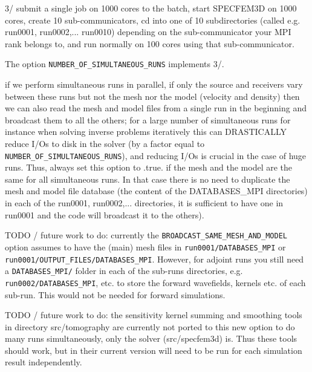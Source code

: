 \begin{description}
3/ submit a single job on 1000 cores to the batch, start SPECFEM3D on 1000 cores, create 10 sub-communicators,
cd into one of 10 subdirectories (called e.g. run0001, run0002,... run0010) depending on the sub-communicator
your MPI rank belongs to, and run normally on 100 cores using that sub-communicator.\newline

The option \texttt{NUMBER\_OF\_SIMULTANEOUS\_RUNS} implements 3/.\newline

\item [{\texttt{BROADCAST\_SAME\_MESH\_AND\_MODEL}}] if we perform simultaneous runs in parallel,
if only the source and receivers vary between these runs
but not the mesh nor the model (velocity and density) then we can also read the mesh and model files
from a single run in the beginning and broadcast them to all the others; for a large number of simultaneous
runs for instance when solving inverse problems iteratively this can DRASTICALLY reduce I/Os to disk in the solver
(by a factor equal to \texttt{NUMBER\_OF\_SIMULTANEOUS\_RUNS}), and reducing I/Os is crucial in the case of huge runs.
Thus, always set this option to .true. if the mesh and the model are the same for all simultaneous runs.
In that case there is no need to duplicate the mesh and model file database (the content of the DATABASES\_MPI
directories) in each of the run0001, run0002,... directories, it is sufficient to have one in run0001
and the code will broadcast it to the others).\newline


TODO / future work to do: currently the \texttt{BROADCAST\_SAME\_MESH\_AND\_MODEL}
option assumes to have the (main) mesh files in \texttt{run0001/DATABASES\_MPI} or
\texttt{run0001/OUTPUT\_FILES/DATABASES\_MPI}.
However, for adjoint runs you still need a \texttt{DATABASES\_MPI/} folder in each of the sub-runs directories,
e.g. \texttt{run0002/DATABASES\_MPI}, etc. to store the forward wavefields, kernels etc. of each sub-run.
This would not be needed for forward simulations.\newline

TODO / future work to do: the sensitivity kernel summing and smoothing tools in directory src/tomography are currently not ported to this new option to do many runs simultaneously, only the solver (src/specfem3d) is. Thus these tools should work, but in their current version will need to be run for each simulation result independently.\newline


\end{description}

